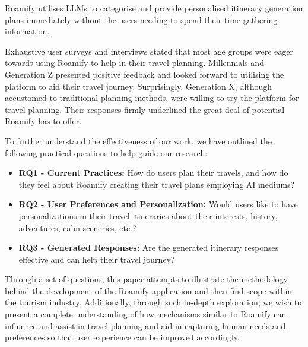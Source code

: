 \documentclass[manuscript,review,anonymous]{acmart}
\begin{document}
    Roamify utilises LLMs to categorise and provide personalised itinerary generation plans immediately without the users needing to spend their time gathering information.
    
    Exhaustive user surveys and interviews stated that most age groups were eager towards using Roamify to help in their travel planning. Millennials and Generation Z presented positive feedback and looked forward to utilising the platform to aid their travel journey. Surprisingly, Generation X, although accustomed to traditional planning methods, were willing to try the platform for travel planning. Their responses firmly underlined the great deal of potential Roamify has to offer.
    
    To further understand the effectiveness of our work, we have outlined the following practical questions to help guide our research:
    
    \begin{itemize}
        \item \textbf{RQ1 - Current Practices:} How do users plan their travels, and how do they feel about Roamify creating their travel plans employing AI mediums?
        \item \textbf{RQ2 - User Preferences and Personalization:} Would users like to have personalizations in their travel itineraries about their interests, history, adventures, calm sceneries, etc.?
        \item \textbf{RQ3 - Generated Responses:} Are the generated itinerary responses effective and can help their travel journey?
        
    \end{itemize}
    
    Through a set of questions, this paper attempts to illustrate the methodology behind the development of the Roamify application and then find scope within the tourism industry. Additionally, through such in-depth exploration, we wish to present a complete understanding of how mechanisms similar to Roamify can influence and assist in travel planning and aid in capturing human needs and preferences so that user experience can be improved accordingly.

\vspace{-7pt}
\end{document}
